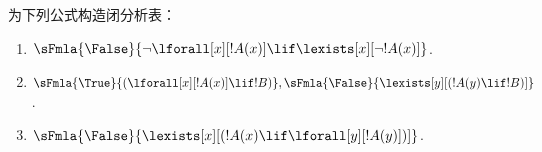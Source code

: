 \documentclass[../../../include/open-logic-section]{subfiles}
\begin{document}
\begin{prob}
为下列公式构造闭分析表：
\begin{enumerate}
\item $\sFmla{\False}{\lnot\lforall[x][!A(x)] \lif \lexists[x][\lnot!A(x)]}$.
\item $\sFmla{\True}{(\lforall[x][!A(x)] \lif !B)}, \sFmla{\False}{\lexists[y][(!A(y) \lif !B)]}$.
\item $\sFmla{\False}{\lexists[x][(!A(x) \lif \lforall[y][!A(y)])]}$.
\end{enumerate}
\end{prob}
\end{document}
